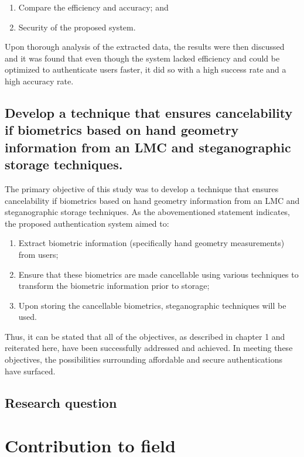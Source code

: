 \begin{enumerate}[label=\roman*.]
    \item Compare the efficiency and accuracy; and 
    \item Security of the proposed system.
\end{enumerate}

Upon thorough analysis of the extracted data, the results were then discussed and it was found that even though the system lacked efficiency and could be optimized to authenticate users faster, it did so with a high success rate and a high accuracy rate.

\subsection{Develop a technique that ensures cancelability if biometrics based on hand geometry information from an LMC and steganographic storage techniques.}

The primary objective of this study was to develop a technique that ensures cancelability if biometrics based on hand geometry information from an LMC and steganographic storage techniques. As the abovementioned statement indicates, the proposed authentication system aimed to:

\begin{enumerate}[label=\roman*.]
    \item Extract biometric information (specifically hand geometry measurements) from users;
    \item Ensure that these biometrics are made cancellable using various techniques to transform the biometric information prior to storage; 
    \item Upon storing the cancellable biometrics, steganographic techniques will be used.
\end{enumerate}

Thus, it can be stated that all of the objectives, as described in chapter 1 and reiterated here, have been successfully addressed and achieved. In meeting these objectives, the possibilities surrounding affordable and secure authentications have surfaced. 


\subsection{Research question}


\section{Contribution to field}

